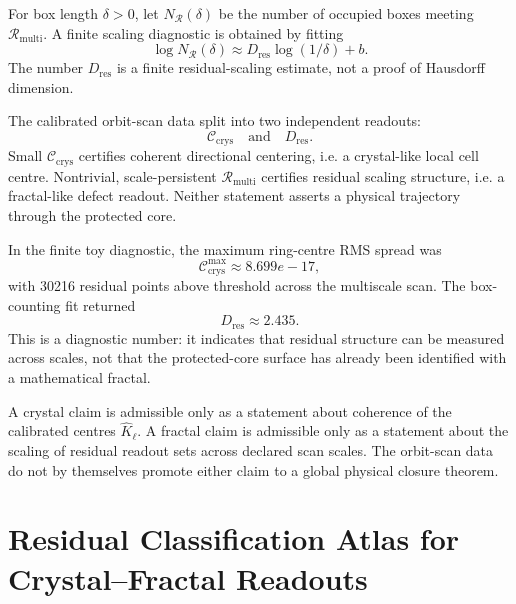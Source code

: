 \begin{definition}
For box length \(\delta>0\), let \(N_{\mathcal R}(\delta)\) be the number of
occupied boxes meeting \(\mathcal R_{\mathrm{multi}}\).  A finite scaling
diagnostic is obtained by fitting
\[
    \log N_{\mathcal R}(\delta)
    \approx
    D_{\mathrm{res}}\log(1/\delta)+b.
\]
The number \(D_{\mathrm{res}}\) is a finite residual-scaling estimate, not a
proof of Hausdorff dimension.
\end{definition}

\begin{proposition}
The calibrated orbit-scan data split into two independent readouts:
\[
    \mathcal C_{\mathrm{crys}}
    \quad\text{and}\quad
    D_{\mathrm{res}}.
\]
Small \(\mathcal C_{\mathrm{crys}}\) certifies coherent directional
centering, i.e. a crystal-like local cell centre.  Nontrivial, scale-persistent
\(\mathcal R_{\mathrm{multi}}\) certifies residual scaling structure, i.e. a
fractal-like defect readout.  Neither statement asserts a physical trajectory
through the protected core.
\end{proposition}

\begin{remark}
In the finite toy diagnostic, the maximum ring-centre RMS spread was
\[
    \mathcal C_{\mathrm{crys}}^{\max}\approx 8.699e-17,
\]
with 30216 residual points above threshold across the multiscale
scan.  The box-counting fit returned
\[
    D_{\mathrm{res}}\approx 2.435.
\]
This is a diagnostic number: it indicates that residual structure can be
measured across scales, not that the protected-core surface has already been
identified with a mathematical fractal.
\end{remark}

\begin{theorem}
A crystal claim is admissible only as a statement about coherence of the
calibrated centres \(\widehat K_\ell\).  A fractal claim is admissible only as a
statement about the scaling of residual readout sets across declared scan
scales.  The orbit-scan data do not by themselves promote either claim to a
global physical closure theorem.
\end{theorem}



\section{Residual Classification Atlas for Crystal--Fractal Readouts}
\label{sec:residual-classification-atlas}

